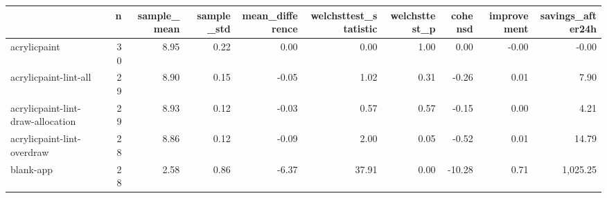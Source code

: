 \begin{tabular}{lrrrrrrrrr}
\toprule
{} &   n &  sample\_mean &  sample\_std &  mean\_difference &  welchsttest\_statistic &  welchsttest\_p &  cohensd &  improvement &  savings\_after24h \\
\midrule
acrylicpaint                      &  30 &         8.95 &        0.22 &             0.00 &                   0.00 &           1.00 &     0.00 &        -0.00 &             -0.00 \\
acrylicpaint-lint-all             &  29 &         8.90 &        0.15 &            -0.05 &                   1.02 &           0.31 &    -0.26 &         0.01 &              7.90 \\
acrylicpaint-lint-draw-allocation &  29 &         8.93 &        0.12 &            -0.03 &                   0.57 &           0.57 &    -0.15 &         0.00 &              4.21 \\
acrylicpaint-lint-overdraw        &  28 &         8.86 &        0.12 &            -0.09 &                   2.00 &           0.05 &    -0.52 &         0.01 &             14.79 \\
blank-app                         &  28 &         2.58 &        0.86 &            -6.37 &                  37.91 &           0.00 &   -10.28 &         0.71 &          1,025.25 \\
\bottomrule
\end{tabular}
